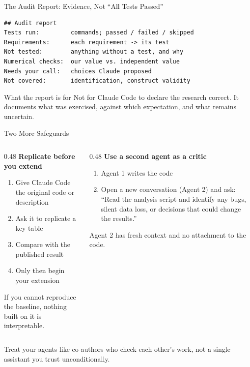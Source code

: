\begin{frame}[fragile]{The Audit Report: Evidence, Not ``All Tests Passed''}
  \begin{lstlisting}[basicstyle=\ttfamily\footnotesize]
## Audit report
Tests run:         commands; passed / failed / skipped
Requirements:      each requirement -> its test
Not tested:        anything without a test, and why
Numerical checks:  our value vs. independent value
Needs your call:   choices Claude proposed
Not covered:       identification, construct validity
  \end{lstlisting}

  \vspace{0.3em}
  \begin{block}{What the report is for}
    Not for Claude Code to declare the research correct. It documents what was exercised, against which expectation, and what remains uncertain.
  \end{block}
\end{frame}

\begin{frame}{Two More Safeguards}
  \begin{columns}[T]
    \begin{column}{0.48\textwidth}
      \textbf{Replicate before you extend}
      \begin{enumerate}
        \small
        \item Give Claude Code the original code or description
        \item Ask it to replicate a key table
        \item Compare with the published result
        \item Only then begin your extension
      \end{enumerate}
      {\small If you cannot reproduce the baseline, nothing built on it is interpretable.}
    \end{column}
    \begin{column}{0.48\textwidth}
      \textbf{Use a second agent as a critic}
      \begin{enumerate}
        \small
        \item Agent 1 writes the code
        \item Open a new conversation (Agent 2) and ask: ``Read the analysis script and identify any bugs, silent data loss, or decisions that could change the results.''
      \end{enumerate}
      {\small Agent 2 has fresh context and no attachment to the code.}
    \end{column}
  \end{columns}

  \vspace{0.8em}
  \alert{Treat your agents like co-authors who check each other's work, not a single assistant you trust unconditionally.}
\end{frame}

